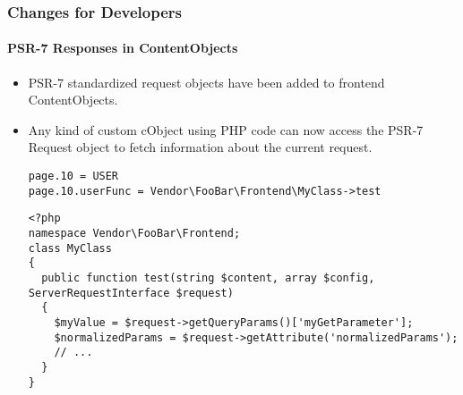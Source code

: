 %

\begin{frame}[fragile]
	\frametitle{Changes for Developers}
	\framesubtitle{PSR-7 Responses in ContentObjects}

	\lstset{basicstyle=\tiny\ttfamily}

	\begin{itemize}
		\item PSR-7 standardized request objects have been added to frontend ContentObjects.
		\item Any kind of custom cObject using PHP code can now access the PSR-7
			Request object to fetch information about the current request.
\begin{lstlisting}
page.10 = USER
page.10.userFunc = Vendor\FooBar\Frontend\MyClass->test
\end{lstlisting}
\begin{lstlisting}
<?php
namespace Vendor\FooBar\Frontend;
class MyClass
{
  public function test(string $content, array $config, ServerRequestInterface $request)
  {
    $myValue = $request->getQueryParams()['myGetParameter'];
    $normalizedParams = $request->getAttribute('normalizedParams');
    // ...
  }
}
\end{lstlisting}

	\end{itemize}
\end{frame}

